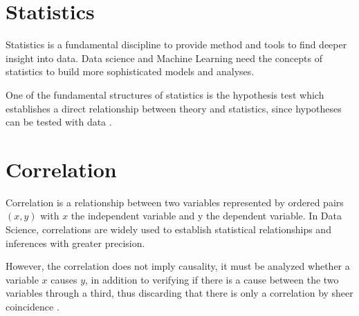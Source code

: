 

\section{Statistics}

Statistics is a fundamental discipline to provide method and tools to find deeper insight into data. Data science and Machine Learning need the concepts of statistics to build more sophisticated models and analyses. 

One of the fundamental structures of statistics is the hypothesis test which establishes a direct relationship between theory and statistics, since hypotheses can be tested with data \cite{weihs2018data}.

\section{Correlation}

Correlation is a relationship between two variables represented by ordered pairs $(x,y)$ with $x$ the independent variable and y the dependent variable. In Data Science, correlations are widely used to establish statistical relationships and inferences with greater precision.

However, the correlation does not imply causality, it must be analyzed whether a variable $x$ causes $y$, in addition to verifying if there is a cause between the two variables through a third, thus discarding that there is only a correlation by sheer coincidence \cite{larson2004estatistica}. 

